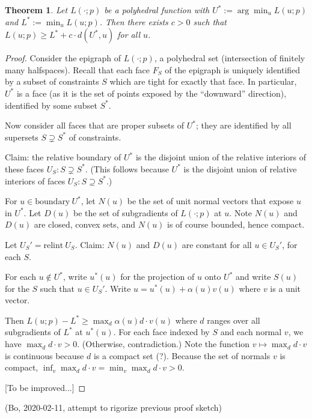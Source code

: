 \documentclass{article}
\newtheorem{theorem}{Theorem}
\theoremstyle{definition}
\begin{document}
\begin{theorem}
  Let $L(\cdot;p)$ be a polyhedral function with $U^* := \arg\min_{u} L(u;p)$ and $L^* := \min_u L(u;p)$.
  Then there exists $c > 0$ such that $L(u;p) \geq L^* + c \cdot d(U^*,u)$ for all $u$.
\end{theorem}
\begin{proof}
  Consider the epigraph of $L(\cdot;p)$, a polyhedral set (intersection of finitely many halfspaces).
  Recall that each face $F_S$ of the epigraph is uniquely identified by a subset of constraints $S$ which are tight for exactly that face.
  In particular, $U^*$ is a face (as it is the set of points exposed by the ``downward'' direction), identified by some subset $S^*$.

  Now consider all faces that are proper subsets of $U^*$; they are identified by all supersets $S \supsetneq S^*$ of constraints.

  Claim: the relative boundary of $U^*$ is the disjoint union of the relative interiors of these faces $U_S : S \supsetneq S^*$.
  (This follows because $U^*$ is the disjoint union of relative interiors of faces $U_S: S \supseteq S^*$.)


  For $u \in \text{boundary}~U^*$, let $N(u)$ be the set of unit normal vectors that expose $u$ in $U^*$.
  Let $D(u)$ be the set of subgradients of $L(\cdot;p)$ at $u$.
  Note $N(u)$ and $D(u)$ are closed, convex sets, and $N(u)$ is of course bounded, hence compact.

  Let $U_S' = \text{relint}~U_S$.
  Claim: $N(u)$ and $D(u)$ are constant for all $u \in U_S'$, for each $S$.

  For each $u \not\in U^*$, write $u^*(u)$ for the projection of $u$ onto $U^*$ and write $S(u)$ for the $S$ such that $u \in U_S'$.
  Write $u = u^*(u) + \alpha(u) v(u)$ where $v$ is a unit vector.
  
  Then $L(u;p) - L^* \geq \max_d \alpha(u) d \cdot v(u)$ where $d$ ranges over all subgradients of $L^*$ at $u^*(u)$.
  For each face indexed by $S$ and each normal $v$, we have $\max_d d \cdot v > 0$. (Otherwise, contradiction.)
  Note the function $v \mapsto \max_d d \cdot v$ is continuous because $d$ is a compact set (?).
  Because the set of normals $v$ is compact, $\inf_v \max_d d \cdot v = \min_v \max_d d \cdot v > 0$.

  [To be improved...]
\end{proof}


\break
(Bo, 2020-02-11, attempt to rigorize previous proof sketch)
\end{document}
